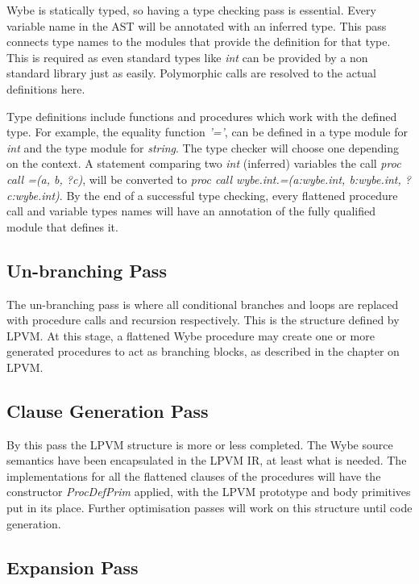 Wybe is statically typed, so having a type checking pass is essential. Every
variable name in the AST will be annotated with an inferred type. This pass
connects type names to the modules that provide the definition for that
type. This is required as even standard types like \textit{int} can be provided
by a non standard library just as easily. Polymorphic calls are resolved to the
actual definitions here.

Type definitions include functions and procedures which work with the defined
type. For example, the equality function \textit{'='}, can be defined in a type
module for \textit{int} and the type module for \textit{string}. The type
checker will choose one depending on the context. A statement comparing two
\textit{int} (inferred) variables the call \textit{proc call =(a, b, ?c)}, will
be converted to \textit{proc call wybe.int.=(a:wybe.int, b:wybe.int,
  ?c:wybe.int)}. By the end of a successful type checking, every flattened
procedure call and variable types names will have an annotation of the fully
qualified module that defines it.


\subsection{Un-branching Pass}

The un-branching pass is where all conditional branches and loops are replaced
with procedure calls and recursion respectively. This is the structure defined
by LPVM. At this stage, a flattened Wybe procedure may create one or more
generated procedures to act as branching blocks, as described in the chapter on
LPVM.


\subsection{Clause Generation Pass}

By this pass the LPVM structure is more or less completed. The Wybe source
semantics have been encapsulated in the LPVM IR, at least what is needed. The
implementations for all the flattened clauses of the procedures will have the
constructor \textit{ProcDefPrim} applied, with the LPVM prototype and body
primitives put in its place. Further optimisation passes will work on this
structure until code generation.


\subsection{Expansion Pass}

